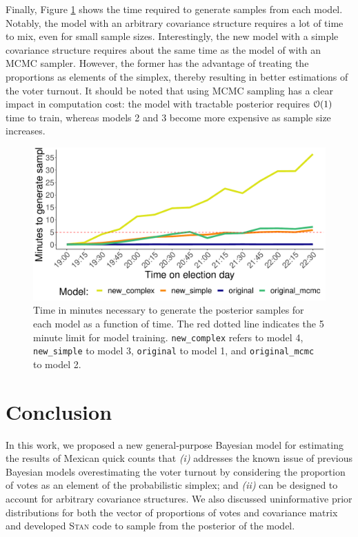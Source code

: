 \documentclass{article}
\begin{document}
Finally, Figure \ref{fig:times} shows the time required to generate samples from each model. Notably, the model with an arbitrary covariance structure requires a lot of time to mix, even for small sample sizes. Interestingly, the new model with a simple covariance structure requires about the same time as the model of \citet{diluvi2018} with an MCMC sampler. However, the former has the advantage of treating the proportions as elements of the simplex, thereby resulting in better estimations of the voter turnout. It should be noted that using MCMC sampling has a clear impact in computation cost: the model with tractable posterior requires $\mathcal{O}(1)$ time to train, whereas models 2 and 3 become more expensive as sample size increases.


\begin{figure}[h]
  \centering
  \includegraphics[scale=0.5]{../fig/times.pdf}
  \caption{Time in minutes necessary to generate the posterior samples for each model as a function of time. The red dotted line indicates the 5 minute limit for model training. \texttt{new\_complex} refers to model 4, \texttt{new\_simple} to model 3, \texttt{original} to model 1, and \texttt{original\_mcmc} to model 2.}
  \label{fig:times}
\end{figure}




\section{Conclusion} \label{sec:conclusion}


In this work, we proposed a new general-purpose Bayesian model for estimating the results of Mexican quick counts that \textit{(i)} addresses the known issue of previous Bayesian models overestimating the voter turnout by considering the proportion of votes as an element of the probabilistic simplex; and \textit{(ii)} can be designed to account for arbitrary covariance structures. We also discussed uninformative prior distributions for both the vector of proportions of votes and covariance matrix and developed \textsc{Stan} code to sample from the posterior of the model.
\\
\end{document}
